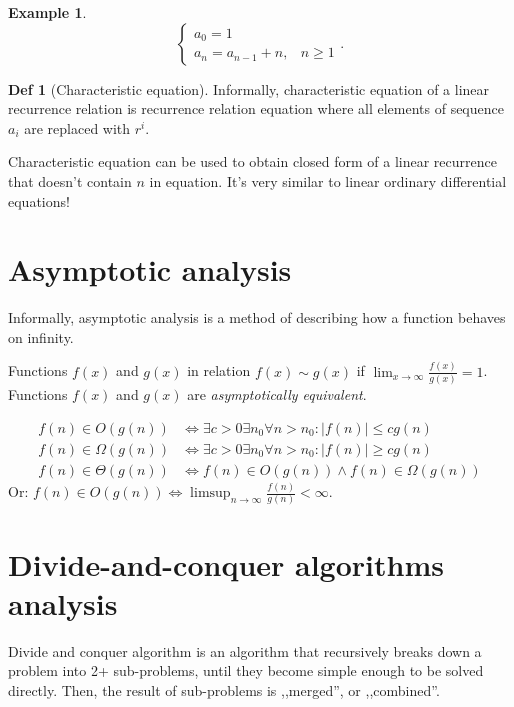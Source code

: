 \documentclass[a4paper]{article}
\theoremstyle{definition}
\newtheorem{definition}{Def}
\newtheorem{example}{Example}[section]
\begin{document}
\begin{example}
  \[
  \begin{cases}
    a_0 = 1 \\
    a_n = a_{n - 1} + n, & n \ge 1
  \end{cases}
  .\]
\end{example}

\begin{definition}[Characteristic equation]
  Informally, characteristic equation of a linear recurrence relation
  is recurrence relation equation
  where all elements of sequence \(a_i\) are replaced with \(r^i\).
\end{definition}

Characteristic equation can be used to obtain closed form of
a linear recurrence that doesn't contain \(n\) in equation.
It's very similar to linear ordinary differential equations!

\section{Asymptotic analysis}

Informally, asymptotic analysis is a method of describing how
a function behaves on infinity.

Functions \(f(x)\) and \(g(x)\) in relation \(f(x) \sim g(x)\)
if  \(\lim_{x \to \infty} \frac{f(x)}{g(x)} = 1\).
Functions \(f(x)\) and \(g(x)\) are \textit{asymptotically equivalent}.

\begin{align*}
f(n) \in O(g(n))
&\iff \exists c > 0 \exists n_0 \forall n > n_0 : |f(n)| \le c g(n) \\
f(n) \in \Omega(g(n))
&\iff \exists c > 0 \exists n_0 \forall n > n_0 : |f(n)| \ge c g(n) \\
f(n) \in \Theta(g(n))
&\iff f(n) \in O(g(n)) \land f(n) \in \Omega(g(n))
\end{align*}
Or: \(f(n) \in O(g(n)) \iff \limsup_{n \to \infty} \frac{f(n)}{g(n)} < \infty\).

\section{Divide-and-conquer algorithms analysis}

Divide and conquer algorithm is an algorithm
that recursively breaks down a problem into
2+ sub-problems, until they become simple enough
to be solved directly. Then,
the result of sub-problems is ,,merged'',
or ,,combined''.
\end{document}
